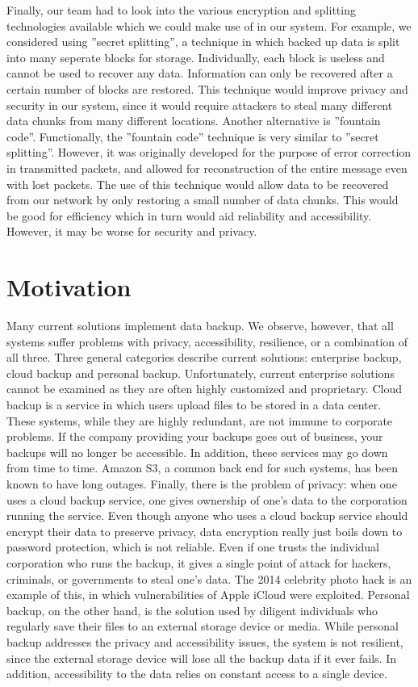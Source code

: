 Finally, our team had to look into the various encryption and splitting technologies available which we could make use of in our system.  For example, we considered using ''secret splitting'', a technique in which backed up data is split into many seperate blocks for storage.  Individually, each block is useless and cannot be used to recover any data.  Information can only be recovered after a certain number of blocks are restored.  This technique would improve privacy and security in our system, since it would require attackers to steal many different data chunks from many different locations.  Another alternative is ''fountain code''.  Functionally, the ''fountain code'' technique is very similar to ''secret splitting''.  However, it was originally developed for the purpose of error correction in transmitted packets, and allowed for reconstruction of the entire message even with lost packets.  The use of this technique would allow data to be recovered from our network by only restoring a small number of data chunks.  This would be good for efficiency which in turn would aid reliability and accessibility.  However, it may be worse for security and privacy.


\section{Motivation}
Many current solutions implement data backup. We observe, however, that all systems suffer problems with privacy, accessibility, resilience, or a combination of all three. Three general categories describe current solutions: enterprise backup, cloud backup and personal backup. Unfortunately, current enterprise solutions cannot be examined as they are often highly customized and proprietary. Cloud backup is a service in which users upload files to be stored in a data center. These systems, while they are highly redundant, are not immune to corporate problems. If the company providing your backups goes out of business, your backups will no longer be accessible. In addition, these services may go down from time to time. Amazon S3, a common back end for such systems, has been known to have long outages. \cite{gigaom} \cite{rightscale} Finally, there is the problem of privacy: when one uses a cloud backup service, one gives ownership of one's data to the corporation running the service.  Even though anyone who uses a cloud backup service should encrypt their data to preserve privacy, data encryption really just boils down to password protection, which is not reliable. \cite{password}  Even if one trusts the individual corporation who runs the backup, it gives a single point of attack for hackers, criminals, or governments to steal one's data.  The 2014 celebrity photo hack is an example of this, in which vulnerabilities of Apple iCloud were exploited. \cite{theguardian}  Personal backup, on the other hand, is the solution used by diligent individuals who regularly save their files to an external storage device or media. While personal backup addresses the privacy and accessibility issues, the system is not resilient, since the external storage device will lose all the backup data if it ever fails. \cite{backblaze} In addition, accessibility to the data relies on constant access to a single device.


